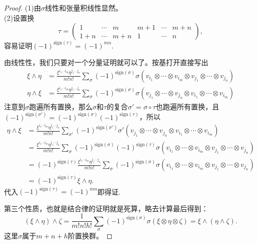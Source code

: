 \documentclass[11pt]{extbook}
\theoremstyle{plain}%
\begin{document}
\begin{proof}
	(1)由$\sigma$线性和张量积线性显然。\\
	(2)设置换
	\[
		\tau=
		\begin{pmatrix}
			1& \cdots & m & m+1 &\cdots &m+n\\
			1+n& \cdots & m+n & 1 &\cdots &n
		\end{pmatrix},
	\]
	容易证明$(-1)^{\mathrm{sign}(\tau)}=(-1)^{mn}$.

	由线性性，我们只要对一个分量证明就可以了。按基打开直接写出
	\[
		\begin{split}
			\xi \wedge \eta&=\frac{\xi^{i_1\dots i_m}\eta^{j_1 \dots j_n}}{m!n!}\sum_{\sigma}(-1)^{\mathrm{sign}(\sigma)}\sigma(v_{i_1}\otimes \cdots \otimes v_{i_m}\otimes v_{j_1}\otimes \cdots \otimes v_{j_n})\\
			\eta \wedge \xi&=\frac{\xi^{i_1\dots i_m}\eta^{j_1 \dots j_n}}{m!n!}\sum_{\sigma}(-1)^{\mathrm{sign}(\sigma)}\sigma(v_{j_1}\otimes \cdots \otimes v_{j_n}\otimes v_{i_1}\otimes \cdots \otimes v_{i_m})
		\end{split}
	\]
	注意到$\sigma$跑遍所有置换，那么$\sigma$和$\tau$的复合$\sigma'=\sigma\circ\tau$也跑遍所有置换，且$(-1)^{\mathrm{sign}(\sigma')}=(-1)^{\mathrm{sign}(\sigma)}(-1)^{\mathrm{sign}(\tau)}$，所以
	\[
		\begin{split}
			\eta \wedge \xi&=\frac{\xi^{i_1\cdots i_m}\eta^{j_1 \cdots j_n}}{m!n!}\sum_{\sigma'}(-1)^{\mathrm{sign}(\sigma')}\sigma'(v_{j_1}\otimes \cdots \otimes v_{j_n}\otimes v_{i_1}\otimes \cdots \otimes v_{i_m})\\
			&=\frac{\xi^{i_1\cdots i_m}\eta^{j_1 \cdots j_n}}{m!n!}\sum_{\sigma}(-1)^{\mathrm{sign}(\sigma)}(-1)^{\mathrm{sign}(\tau)}\sigma(v_{i_1}\otimes \cdots \otimes v_{i_m}\otimes v_{j_1}\otimes \cdots \otimes v_{j_n})\\
			&=(-1)^{\mathrm{sign}(\tau)}\frac{\xi^{i_1\cdots i_m}\eta^{j_1 \cdots j_n}}{m!n!}\sum_{\sigma}(-1)^{\mathrm{sign}(\sigma)}\sigma(v_{i_1}\otimes \cdots \otimes v_{i_m}\otimes v_{j_1}\otimes \cdots \otimes v_{j_n})\\
			&=(-1)^{\mathrm{sign}(\tau)} \xi \wedge \eta.
		\end{split}
	\]
	代入$(-1)^{\mathrm{sign}(\tau)}=(-1)^{mn}$即得证.

	第三个性质，也就是结合律的证明就是死算，略去计算最后得到：
	\[
		(\xi \wedge \eta) \wedge \zeta=\frac{1}{m!n!h!}\sum_{\sigma}(-1)^{\mathrm{sign}(\sigma)}\sigma(\xi \otimes \eta \otimes \zeta)=\xi \wedge (\eta \wedge \zeta).
	\]
	这里$\sigma$属于$m+n+h$阶置换群。
\end{proof}
\end{document}
